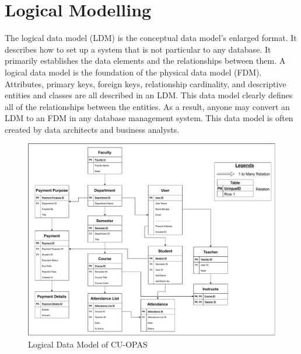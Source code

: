 \section{Logical Modelling}\label{sec:lm}
The logical data model (LDM) is the conceptual data model's enlarged format. It describes how to set up a system that is not particular to any database. It primarily establishes the data elements and the relationships between them. A logical data model is the foundation of the physical data model (FDM). Attributes, primary keys, foreign keys, relationship cardinality, and descriptive entities and classes are all described in an LDM. This data model clearly defines all of the relationships between the entities. As a result, anyone may convert an LDM to an FDM in any database management system. This data model is often created by data architects and business analysts.\\

\begin{figure}[H]
    \centering
    \includegraphics[width=1\textwidth]{images/logical}
    \caption{Logical Data Model of CU-OPAS}
    \label{fig:logical}
\end{figure}

\clearpage